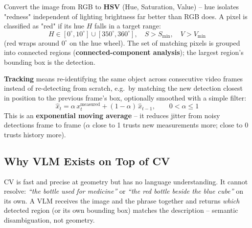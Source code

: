 \documentclass[11pt,a4paper]{article}
\begin{document}
\begin{mathbox}[title={\textbf{Simple color-based detection (if not using a trained model)}}]
Convert the image from RGB to \textbf{HSV} (Hue, Saturation, Value) -- hue isolates "redness"
independent of lighting brightness far better than RGB does. A pixel is classified as "red" if
its hue $H$ falls in a target range:
\[
H \in [0^\circ, 10^\circ] \cup [350^\circ, 360^\circ], \quad S > S_{\min}, \quad V > V_{\min}
\]
(red wraps around $0^\circ$ on the hue wheel). The set of matching pixels is grouped into
connected regions (\textbf{connected-component analysis}); the largest region's bounding box is
the detection.
\end{mathbox}

\textbf{Tracking} means re-identifying the same object across consecutive video frames instead of
re-detecting from scratch, e.g.\ by matching the new detection closest in position to the
previous frame's box, optionally smoothed with a simple filter:
\[
\hat{x}_t = \alpha\, x_t^{\text{measured}} + (1-\alpha)\, \hat{x}_{t-1}, \qquad 0 < \alpha \le 1
\]
This is an \textbf{exponential moving average} -- it reduces jitter from noisy detections frame
to frame ($\alpha$ close to 1 trusts new measurements more; close to 0 trusts history more).

\subsection{Why VLM Exists on Top of CV}

CV is fast and precise at geometry but has no language understanding. It cannot resolve:
\emph{``the bottle used for medicine''} or \emph{``the red bottle beside the blue cube''} on its
own. A VLM receives the image and the phrase together and returns \emph{which} detected region
(or its own bounding box) matches the description -- semantic disambiguation, not geometry.

\begin{center}
\end{center}
\end{document}
